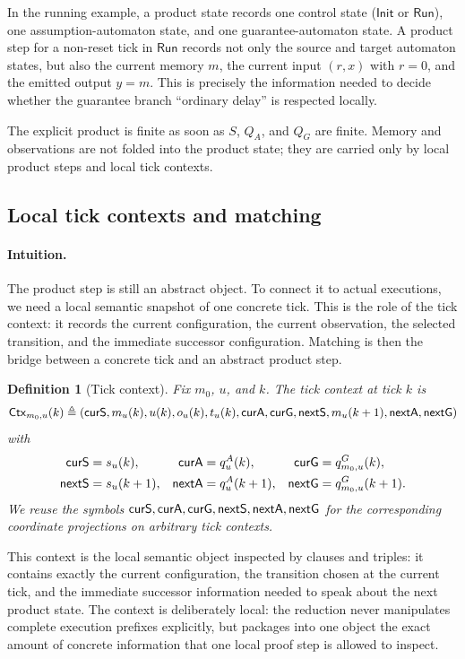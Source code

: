 \documentclass[acmsmall,screen]{acmart}
\theoremstyle{leftplain}
\theoremstyle{leftdefinition}
\newtheorem{definition}[theorem]{Definition}
\theoremstyle{leftremark}
\begin{document}
\noindent{}
In the running example, a product state records one control state
($\mathsf{Init}$ or $\mathsf{Run}$), one assumption-automaton state, and one
guarantee-automaton state. A product step for a non-reset tick in
$\mathsf{Run}$ records not only the source and target automaton states, but also
the current memory $m$, the current input $(r,x)$ with $r=0$, and the emitted
output $y=m$. This is precisely the information needed to decide whether the
guarantee branch ``ordinary delay'' is respected locally.

The explicit product is finite as soon as $S$, $Q_A$, and $Q_G$ are finite.
Memory and observations are not folded into the product state; they are carried
only by local product steps and local tick contexts.

\subsection{Local tick contexts and matching}
\paragraph{Intuition.}
The product step is still an abstract object. To connect it to actual
executions, we need a local semantic snapshot of one concrete tick. This is the
role of the tick context: it records the current configuration, the current
observation, the selected transition, and the immediate successor
configuration. Matching is then the bridge between a concrete tick and an
abstract product step.

\begin{definition}[Tick context]
Fix $m_0$, $u$, and $k$. The tick context at tick $k$ is
\[
  \mathsf{Ctx}_{m_0,u}(k) \triangleq
  (\mathsf{curS}, m_u(k), u(k), o_u(k), t_u(k), \mathsf{curA}, \mathsf{curG},
   \mathsf{nextS}, m_u(k+1), \mathsf{nextA}, \mathsf{nextG})
\]
with
\begin{align*}
  \mathsf{curS} &= s_u(k),            & \mathsf{curA} &= q^A_u(k),            & \mathsf{curG} &= q^G_{m_0,u}(k), \\
  \mathsf{nextS} &= s_u(k+1),         & \mathsf{nextA} &= q^A_u(k+1),         & \mathsf{nextG} &= q^G_{m_0,u}(k+1).
\end{align*}
We reuse the symbols $\mathsf{curS},\mathsf{curA},\mathsf{curG},\mathsf{nextS},\mathsf{nextA},\mathsf{nextG}$ for the
corresponding coordinate projections on arbitrary tick contexts.
\end{definition}

This context is the local semantic object inspected by clauses and triples: it
contains exactly the current configuration, the transition chosen at the
current tick, and the immediate successor information needed to speak about the
next product state. The context is deliberately local: the reduction never
manipulates complete execution prefixes explicitly, but packages into one
object the exact amount of concrete information that one local proof step is
allowed to inspect.
\end{document}

